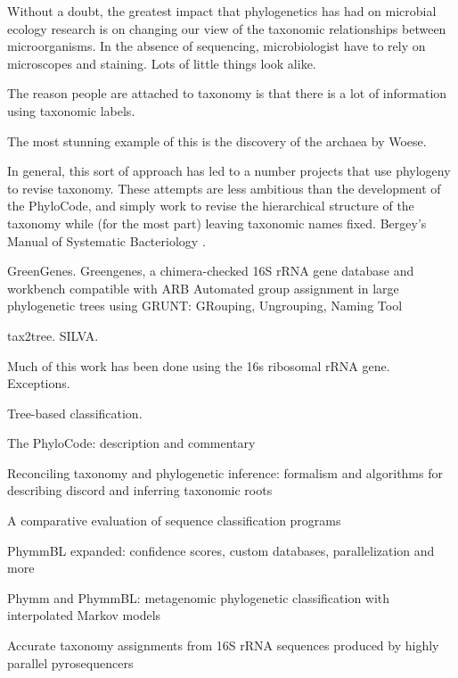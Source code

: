 \documentclass{amsart}
\begin{document}
Without a doubt, the greatest impact that phylogenetics has had on microbial ecology research is on changing our view of the taxonomic relationships between microorganisms.
In the absence of sequencing, microbiologist have to rely on microscopes and staining.
Lots of little things look alike.

The reason people are attached to taxonomy is that there is a lot of information using taxonomic labels.

The most stunning example of this is the discovery of the archaea by Woese.

In general, this sort of approach has led to a number projects that use phylogeny to revise taxonomy.
These attempts are less ambitious than the development of the PhyloCode, and simply work to revise the hierarchical structure of the taxonomy while (for the most part) leaving taxonomic names fixed.
Bergey's Manual of Systematic Bacteriology \cite{kreig1984bergey}.

GreenGenes.
\cite{desantis2006greengenes}
{Greengenes, a chimera-checked 16S rRNA gene database and workbench compatible with ARB}
\cite{dalevi2007automated}
Automated group assignment in large phylogenetic trees using GRUNT: GRouping, Ungrouping, Naming Tool



tax2tree.
SILVA.

Much of this work has been done using the 16s ribosomal rRNA gene.
Exceptions.

Tree-based classification.

\cite{forey2001phylocode}
{The PhyloCode: description and commentary}

\cite{matsen2011reconciling}
Reconciling taxonomy and phylogenetic inference: formalism and algorithms for describing discord and inferring taxonomic roots

\cite{carma}

\cite{bazinet2012comparative}
A comparative evaluation of sequence classification programs

\cite{brady2011phymmbl}
PhymmBL expanded: confidence scores, custom databases, parallelization and more

\cite{brady2009phymm}
Phymm and PhymmBL: metagenomic phylogenetic classification with interpolated Markov models

\cite{ColeEaRDP2009}

\cite{liu2008accurate}
Accurate taxonomy assignments from 16S rRNA sequences produced by highly parallel pyrosequencers
\end{document}
